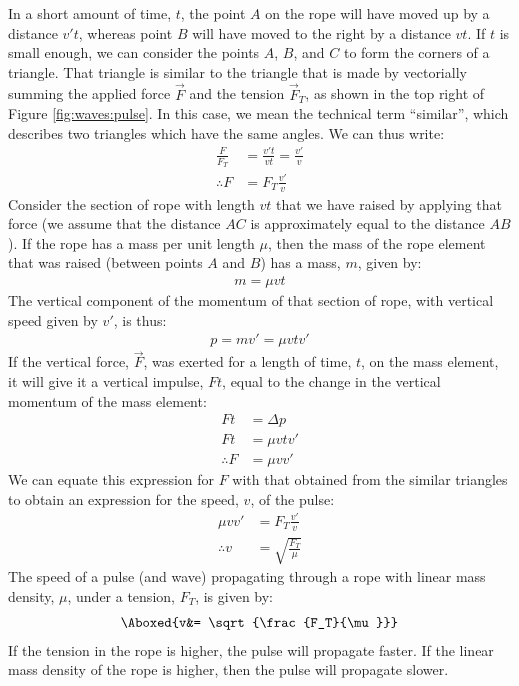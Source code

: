 In a short amount of time, $t$, the point $A$ on the rope will have moved up by a distance $v't$, whereas point $B$ will have moved to the right by a distance $vt$. If $t$ is small enough, we can consider the points $A$, $B$, and $C$ to form the corners of a triangle. That triangle is similar to the triangle that is made by vectorially summing the applied force $\vec F$ and the tension $\vec F_T$, as shown in the top right of Figure \ref{fig:waves:pulse}. In this case, we mean the technical term ``similar'', which describes two triangles which have the same angles. We can thus write:
\begin{align*}
\frac{F}{F_T}&=\frac{v't}{vt}=\frac{v'}{v}\\
\therefore F&= F_T \frac{v'}{v}
\end{align*}
Consider the section of rope with length $vt$ that we have raised by applying that force (we assume that the distance $AC$ is approximately equal to the distance $AB$). If the rope has a mass per unit length $\mu$, then the mass of the rope element that was raised (between points $A$ and $B$) has a mass, $m$, given by:
\begin{align*}
m = \mu vt
\end{align*}
The vertical component of the momentum of that section of rope, with vertical speed given by $v'$, is thus:
\begin{align*}
p = mv' = \mu vt v'
\end{align*}
If the vertical force, $\vec F$, was exerted for a length of time, $t$, on the mass element, it will give it a vertical impulse, $Ft$, equal to the change in the vertical momentum of the mass element:
\begin{align*}
Ft &= \Delta p \\
Ft &= \mu vt v'\\
\therefore F &= \mu v v'
\end{align*}
We can equate this expression for $F$ with that obtained from the similar triangles to obtain an expression for the speed, $v$, of the pulse:
\begin{align*}
\mu v v' &= F_T \frac{v'}{v}\\
\therefore v&= \sqrt{\frac{F_T}{\mu}}
\end{align*}
The speed of a pulse (and wave) propagating through a rope with linear mass density, $\mu$, under a tension, $F_T$, is given by:
\begin{align}
\Aboxed{v&= \sqrt{\frac{F_T}{\mu}}}
\end{align}
If the tension in the rope is higher, the pulse will propagate faster. If the linear mass density of the rope is higher, then the pulse will propagate slower. 


